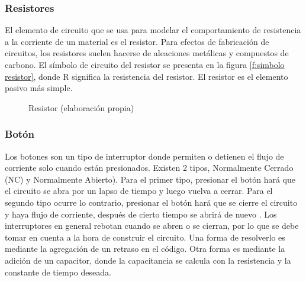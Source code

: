 \documentclass[12pt,letterpaper]{article}     %
\begin{document}
\subsubsection{Resistores}
El elemento de circuito que se usa para modelar el comportamiento de resistencia a la corriente de un material es el resistor. Para efectos de fabricación de circuitos, los resistores suelen hacerse de aleaciones metálicas y compuestos de carbono. El símbolo
de circuito del resistor se presenta en la figura \ref{f:simbolo resistor}, donde R significa la resistencia del resistor. El resistor es el elemento pasivo más simple. \cite{alexander}

\begin{figure}[H]
 \centering
 \caption{Resistor (elaboración propia)}
 \label{f:resistor}
\end{figure}

\subsubsection{Bot\'on}
Los botones son un tipo de interruptor donde permiten o detienen el flujo de corriente solo cuando están presionados. Existen 2 tipos, Normalmente Cerrado (NC) y Normalmente Abierto). Para el primer tipo, presionar el botón hará que el circuito se abra por un lapso de tiempo y luego vuelva a cerrar. Para el segundo tipo ocurre lo contrario, presionar el botón hará que se cierre el circuito y haya flujo de corriente, después de cierto tiempo se abrirá de nuevo \cite{botondef}. Los interruptores en general rebotan cuando se abren o se cierran, por lo que se debe tomar en cuenta a la hora de construir el circuito. Una forma de resolverlo es mediante la agregación de un retraso en el código. Otra forma es mediante la adición de un capacitor, donde la capacitancia se calcula con la resistencia y la constante de tiempo deseada.
\end{document}
